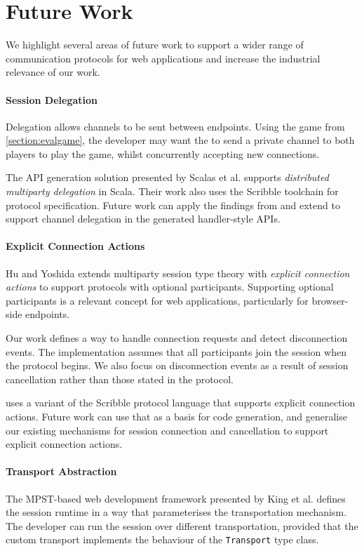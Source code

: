 \section{Future Work}
\label{section:future}

We highlight several areas of future work
to support a wider range of communication protocols
for web applications and increase the 
industrial relevance of our work.

\paragraph{Session Delegation}
Delegation allows channels to be sent between endpoints.
Using the  game
from \cref{section:evalgame}, the developer
may want the  to send a private channel
to both players to play the game,
whilst concurrently accepting new connections.

The API generation solution 
presented by Scalas et al. \cite{LinearDecomp} supports
\textit{distributed multiparty delegation} in Scala.
Their work also uses the Scribble toolchain
for protocol specification.
Future work can apply the findings from \cite{LinearDecomp}
and extend \codegen to support channel delegation
in the generated handler-style APIs.

\paragraph{Explicit Connection Actions}
Hu and Yoshida \cite{ExplicitConnections} extends 
multiparty session type theory
with \textit{explicit connection actions} to support protocols 
with optional participants.
Supporting optional participants is a relevant concept
for web applications, particularly for browser-side endpoints.

Our work defines a way to handle connection requests
and detect disconnection events. The implementation assumes that
all participants join the session when the protocol begins.
We also focus on disconnection events as a result of session
cancellation rather than those stated in the protocol.

\cite{ExplicitConnections} uses a variant of the Scribble protocol
language that supports explicit connection actions. Future work
can use that as a basis for code generation, and generalise
our existing mechanisms for session connection and cancellation
to support explicit connection actions.

\paragraph{Transport Abstraction}
The MPST-based web development framework presented by 
King et al. \cite{PureScript2019} defines the session runtime
in a way that parameterises the transportation mechanism.
The developer can run the session over different transportation,
provided that the custom transport implements the behaviour
of the \texttt{Transport} type class.

